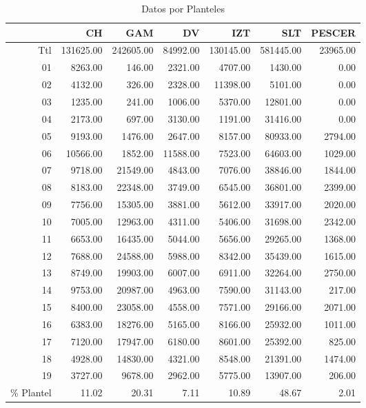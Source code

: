 \documentclass{article}
\begin{document}
\begin{table}[ht]
\centering
\caption{Datos por Planteles} 
\begin{tabular}{rrrrrrr}
  \hline
 & CH & GAM & DV & IZT & SLT & PESCER \\ 
  \hline
Ttl & 131625.00 & 242605.00 & 84992.00 & 130145.00 & 581445.00 & 23965.00 \\ 
  01 & 8263.00 & 146.00 & 2321.00 & 4707.00 & 1430.00 & 0.00 \\ 
  02 & 4132.00 & 326.00 & 2328.00 & 11398.00 & 5101.00 & 0.00 \\ 
  03 & 1235.00 & 241.00 & 1006.00 & 5370.00 & 12801.00 & 0.00 \\ 
  04 & 2173.00 & 697.00 & 3130.00 & 1191.00 & 31416.00 & 0.00 \\ 
  05 & 9193.00 & 1476.00 & 2647.00 & 8157.00 & 80933.00 & 2794.00 \\ 
  06 & 10566.00 & 1852.00 & 11588.00 & 7523.00 & 64603.00 & 1029.00 \\ 
  07 & 9718.00 & 21549.00 & 4843.00 & 7076.00 & 38846.00 & 1844.00 \\ 
  08 & 8183.00 & 22348.00 & 3749.00 & 6545.00 & 36801.00 & 2399.00 \\ 
  09 & 7756.00 & 15305.00 & 3881.00 & 5612.00 & 33917.00 & 2020.00 \\ 
  10 & 7005.00 & 12963.00 & 4311.00 & 5406.00 & 31698.00 & 2342.00 \\ 
  11 & 6653.00 & 16435.00 & 5044.00 & 5656.00 & 29265.00 & 1368.00 \\ 
  12 & 7688.00 & 24588.00 & 5988.00 & 8342.00 & 35439.00 & 1615.00 \\ 
  13 & 8749.00 & 19903.00 & 6007.00 & 6911.00 & 32264.00 & 2750.00 \\ 
  14 & 9753.00 & 20987.00 & 4963.00 & 7590.00 & 31143.00 & 217.00 \\ 
  15 & 8400.00 & 23058.00 & 4558.00 & 7571.00 & 29166.00 & 2071.00 \\ 
  16 & 6383.00 & 18276.00 & 5165.00 & 8166.00 & 25932.00 & 1011.00 \\ 
  17 & 7120.00 & 17947.00 & 6180.00 & 8601.00 & 25392.00 & 825.00 \\ 
  18 & 4928.00 & 14830.00 & 4321.00 & 8548.00 & 21391.00 & 1474.00 \\ 
  19 & 3727.00 & 9678.00 & 2962.00 & 5775.00 & 13907.00 & 206.00 \\ 
  \% Plantel & 11.02 & 20.31 & 7.11 & 10.89 & 48.67 & 2.01 \\ 
   \hline
\end{tabular}
\end{table}
\end{document}

